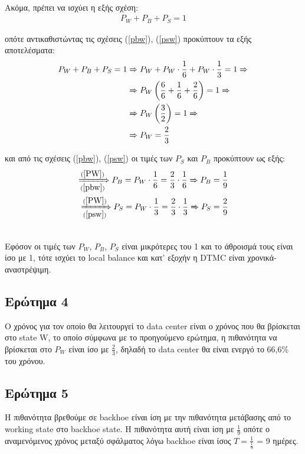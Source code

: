 \noindent\\
Ακόμα, πρέπει να ισχύει η εξής σχέση:
\begin{align*}
	P_W + P_B + P_S = 1
\end{align*}

οπότε αντικαθιστώντας τις σχέσεις (\ref{pbw}), (\ref{psw}) προκύπτουν τα εξής αποτελέσματα:
\begin{align}
	P_W + P_B + P_S = 1 &\xRightarrow{} P_W + P_W \cdot \frac{1}{6} + P_W \cdot \frac{1}{3} = 1 \notag \xRightarrow{}\\
						&\xRightarrow{} P_W \left( \frac{6}{6} + \frac{1}{6} +  \frac{2}{6} \right) = 1 \notag \xRightarrow{}\\
						&\xRightarrow{} P_W \left( \frac{3}{2} \right) = 1 \notag \xRightarrow{}\\
						&\xRightarrow{} P_W = \frac{2}{3} \label{PW}
\end{align}

και από τις σχέσεις (\ref{pbw}), (\ref{psw}) οι τιμές των $P_S$ και $P_B$ προκύπτουν ως εξής:
\begin{align}
	\xRightarrow[(\ref{pbw})]{(\ref{PW})} P_B = P_W \cdot \frac{1}{6} = \frac{2}{3} \cdot \frac{1}{6} \xRightarrow{} P_B = \frac{1}{9}\\
	\xRightarrow[(\ref{psw})]{(\ref{PW})} P_S = P_W \cdot \frac{1}{3} = \frac{2}{3} \cdot \frac{1}{3} \xRightarrow{} P_S = \frac{2}{9}
\end{align}


\noindent\\
Εφόσον οι τιμές των $P_W$, $P_B$, $P_S$ είναι μικρότερες του 1 και το άθροισμά τους είναι ίσο με 1, τότε ισχύει το local balance και κατ' εξοχήν η DTMC είναι χρονικά-αναστρέψιμη.

\subsection*{Ερώτημα 4}
\label{ex2q4}

Ο χρόνος για τον οποίο θα λειτουργεί το data center είναι ο χρόνος που θα βρίσκεται στο state W, το οποίο σύμφωνα με το προηγούμενο ερώτημα, η πιθανότητα να βρίσκεται στο $P_W$ είναι ίσο με $\frac{2}{3}$, δηλαδή το data center θα είναι ενεργό το 66,6\% του χρόνου.

\subsection*{Ερώτημα 5}
\label{ex2q5}

Η πιθανότητα βρεθούμε σε backhoe είναι ίση με την πιθανότητα μετάβασης από το working state στο backhoe state. Η πιθανότητα αυτή είναι ίση με $\frac{1}{9}$ οπότε ο αναμενόμενος χρόνος μεταξύ σφάλματος λόγω backhoe είναι ίσος $T = \frac{1}{\frac{1}{9}}$ = 9 ημέρες.
